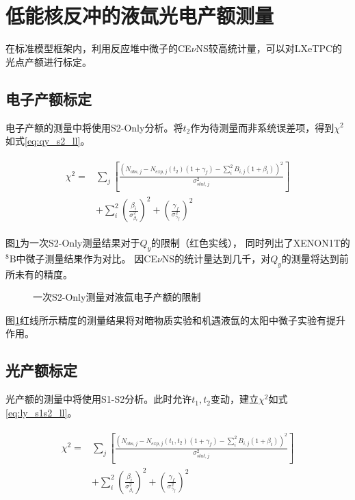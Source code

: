\section{低能核反冲的液氙光电产额测量}

在标准模型框架内，利用反应堆中微子的CE$\nu$NS较高统计量，可以对LXeTPC的光点产额进行标定。

\subsection{电子产额标定}

电子产额的测量中将使用S2-Only分析。将$t_2$作为待测量而非系统误差项，得到$\chi^2$如式\ref{eq:qy_s2_ll}。

\begin{align}
    \label{eq:qy_s2_ll}
    \begin{split}
    \chi^2 =& \sum_j\left[\frac{\left(N_{obs,j} - N_{exp,j}(t_2)(1 + \gamma_f) 
    - \sum_{i}^2 B_{i,j}(1 + \beta_i)\right)^2}{\sigma^2_{stat,j}}\right] \\
    & + \sum_{i}^2(\frac{\beta_i}{\sigma^2_{\beta_i}})^2 + (\frac{\gamma_f}{\sigma^2_{\gamma_f}})^2
    \end{split}
\end{align}

图\ref{fig:qy_sensitivity_s2only}为一次S2-Only测量结果对于$Q_y$的限制（红色实线），
同时列出了XENON1T的${}^{8}\mathrm{B}$中微子测量结果作为对比\cite{aprile_search_2021}。
因CE$\nu$NS的统计量达到几千，对$Q_y$的测量将达到前所未有的精度。

\begin{figure}
  \centering
  
  \caption{\label{fig:qy_sensitivity_s2only} 一次S2-Only测量对液氙电子产额的限制}
\end{figure}

图\ref{fig:qy_sensitivity_s2only}红线所示精度的测量结果将对暗物质实验和机遇液氙的太阳中微子实验有提升作用。

\subsection{光产额标定}

光产额的测量中将使用S1-S2分析。此时允许$t_1,t_2$变动，建立$\chi^2$如式\ref{eq:ly_s1s2_ll}。

\begin{align}
    \label{eq:ly_s1s2_ll}
    \begin{split}
    \chi^2 =& \sum_j\left[\frac{\left(N_{obs,j} - N_{exp,j}(t_1,t_2)(1 + \gamma_f) 
    - \sum_{i}^2 B_{i,j}(1 + \beta_i)\right)^2}{\sigma^2_{stat,j}}\right] \\
    & + \sum_{i}^2(\frac{\beta_i}{\sigma^2_{\beta_i}})^2 + (\frac{\gamma_f}{\sigma^2_{\gamma_f}})^2
    \end{split}
\end{align}

